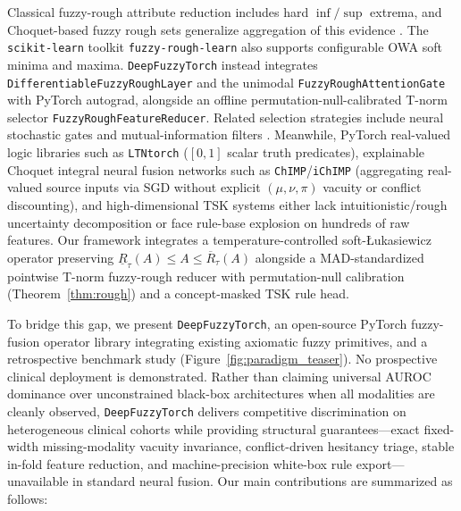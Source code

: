 \documentclass[10pt,twocolumn]{article}
\begin{document}
Classical fuzzy-rough attribute reduction
\cite{dubois1990rough,jensen2004fuzzy,cornelis2010attribute} includes hard $\inf/\sup$
extrema, and Choquet-based fuzzy rough sets generalize aggregation of this evidence
\cite{theerens2022choquet}. The \texttt{scikit-learn} toolkit \texttt{fuzzy-rough-learn}
\cite{lenz2022fuzzyroughlearn} also supports configurable OWA soft minima and maxima.
\texttt{DeepFuzzyTorch} instead integrates \texttt{DifferentiableFuzzyRoughLayer} and the
unimodal \texttt{FuzzyRoughAttentionGate} with PyTorch autograd, alongside an offline
permutation-null-calibrated T-norm selector \texttt{FuzzyRoughFeatureReducer}. Related
selection strategies include neural stochastic gates \cite{yamada2020feature} and
mutual-information filters \cite{peng2005feature}. Meanwhile, PyTorch real-valued logic
libraries such as
\texttt{LTNtorch} \cite{badreddine2022ltntorch} ($[0,1]$ scalar truth predicates), explainable
Choquet integral neural fusion networks such as \texttt{ChIMP}/\texttt{iChIMP}
\cite{islam2020chimp} (aggregating real-valued source inputs via SGD without explicit
$(\mu,\nu,\pi)$ vacuity or conflict discounting), and high-dimensional TSK systems
\cite{jang1993anfis,wu2020optimize,cui2021curse} either lack intuitionistic/rough uncertainty
decomposition or face rule-base explosion on hundreds of raw features. Our framework integrates
a temperature-controlled soft-{\L}ukasiewicz operator preserving $\underline{R}_\tau(A) \le A
\le \overline{R}_\tau(A)$ alongside a MAD-standardized pointwise T-norm fuzzy-rough reducer
with permutation-null calibration (Theorem~\ref{thm:rough}) and a concept-masked TSK rule head.

To bridge this gap, we present \texttt{DeepFuzzyTorch}, an open-source PyTorch fuzzy-fusion
operator library integrating existing axiomatic fuzzy primitives, and a retrospective
benchmark study (Figure~\ref{fig:paradigm_teaser}). No prospective clinical deployment is
demonstrated.
Rather than claiming universal AUROC dominance over unconstrained black-box architectures when
all modalities are cleanly observed, \texttt{DeepFuzzyTorch} delivers competitive
discrimination on heterogeneous clinical cohorts while providing structural guarantees---exact
fixed-width
missing-modality vacuity invariance, conflict-driven hesitancy triage, stable in-fold feature
reduction, and machine-precision white-box rule export---unavailable in standard neural fusion.
Our main contributions are summarized as follows:
\end{document}
